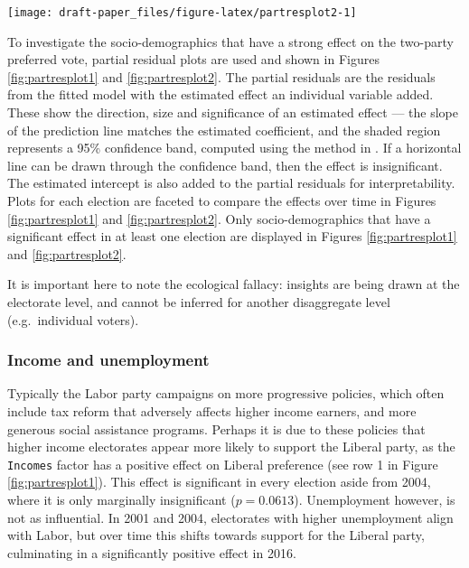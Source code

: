 \documentclass[11pt,a4paper,]{article}
\let\origfigure\figure
\let\endorigfigure\endfigure
\renewenvironment{figure}[1][2] {
    \expandafter\origfigure\expandafter[htbp]
} {
    \endorigfigure
}
\begin{document}
\begin{figure}[h]

{\centering \texttt{[image: draft-paper\_files/figure-latex/partresplot2-1]} 

}

\caption{Partial residual plots by election year for a selection of predictors. Linear model with 95\% confidence bands overlaid. Several predictors have a negative relationship: with larger values indicating the electorate more likely preferences Labor. Most relationships are relatively stable over elections, except OtherLanguage and Education.}\label{fig:partresplot2}
\end{figure}

To investigate the socio-demographics that have a strong effect on the two-party preferred vote, partial residual plots are used and shown in Figures \ref{fig:partresplot1} and \ref{fig:partresplot2}. The partial residuals are the residuals from the fitted model with the estimated effect an individual variable added. These show the direction, size and significance of an estimated effect --- the slope of the prediction line matches the estimated coefficient, and the shaded region represents a 95\% confidence band, computed using the method in \textcite{visreg}. If a horizontal line can be drawn through the confidence band, then the effect is insignificant. The estimated intercept is also added to the partial residuals for interpretability. Plots for each election are faceted to compare the effects over time in Figures \ref{fig:partresplot1} and \ref{fig:partresplot2}. Only socio-demographics that have a significant effect in at least one election are displayed in Figures \ref{fig:partresplot1} and \ref{fig:partresplot2}.

It is important here to note the ecological fallacy: insights are being drawn at the electorate level, and cannot be inferred for another disaggregate level (e.g.~individual voters).

\hypertarget{income-and-unemployment}{%
\subsubsection{Income and unemployment}\label{income-and-unemployment}}

Typically the Labor party campaigns on more progressive policies, which often include tax reform that adversely affects higher income earners, and more generous social assistance programs. Perhaps it is due to these policies that higher income electorates appear more likely to support the Liberal party, as the \texttt{Incomes} factor has a positive effect on Liberal preference (see row 1 in Figure \ref{fig:partresplot1}). This effect is significant in every election aside from 2004, where it is only marginally insignificant (\(p = 0.0613\)). Unemployment however, is not as influential. In 2001 and 2004, electorates with higher unemployment align with Labor, but over time this shifts towards support for the Liberal party, culminating in a significantly positive effect in 2016.
\end{document}
